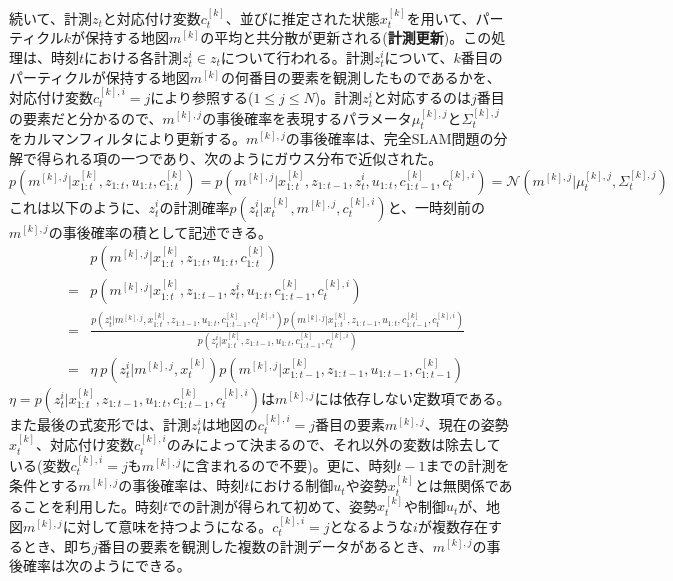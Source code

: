 \documentclass[dvipdfmx,a4paper]{jsarticle}
\begin{document}
続いて、計測$z_t$と対応付け変数$c_t^{[k]}$、並びに推定された状態$x_t^{[k]}$を用いて、パーティクル$k$が保持する地図$m^{[k]}$の平均と共分散が更新される(\textbf{計測更新})。この処理は、時刻$t$における各計測$z_t^i \in z_t$について行われる。計測$z_t^i$について、$k$番目のパーティクルが保持する地図$m^{[k]}$の何番目の要素を観測したものであるかを、対応付け変数$c_t^{[k], i} = j$により参照する($1 \le j \le N$)。計測$z_t^i$と対応するのは$j$番目の要素だと分かるので、$m^{[k], j}$の事後確率を表現するパラメータ$\mu_t^{[k], j}$と$\Sigma_t^{[k], j}$をカルマンフィルタにより更新する。$m^{[k], j}$の事後確率は、完全SLAM問題の分解で得られる項の一つであり、次のようにガウス分布で近似された。
\begin{equation}
	p(m^{[k], j} | x_{1 : t}^{[k]}, z_{1 : t}, u_{1 : t}, c_{1 : t}^{[k]}) = p(m^{[k], j} | x_{1 : t}^{[k]}, z_{1 : t - 1}, z_t^i, u_{1 : t}, c_{1 : t - 1}^{[k]}, c_t^{[k], i}) = \mathcal{N}(m^{[k], j} | \mu_t^{[k], j}, \Sigma_t^{[k], j})
\end{equation}
これは以下のように、$z_t^i$の計測確率$p(z_t^i | x_t^{[k]}, m^{[k], j}, c_t^{[k], i})$と、一時刻前の$m^{[k], j}$の事後確率の積として記述できる。
\begin{eqnarray}
	&& p(m^{[k], j} | x_{1 : t}^{[k]}, z_{1 : t}, u_{1 : t}, c_{1 : t}^{[k]}) \nonumber \\
	&=& p(m^{[k], j} | x_{1 : t}^{[k]}, z_{1 : t - 1}, z_t^i, u_{1 : t}, c_{1 : t - 1}^{[k]}, c_t^{[k], i}) \nonumber \\
	&=& \frac{p(z_t^i | m^{[k], j}, x_{1 : t}^{[k]}, z_{1 : t - 1}, u_{1 : t}, c_{1 : t - 1}^{[k]}, c_t^{[k], i}) p(m^{[k], j} | x_{1 : t}^{[k]}, z_{1 : t - 1}, u_{1 : t}, c_{1 : t - 1}^{[k]}, c_t^{[k], i})}{p(z_t^i | x_{1 : t}^{[k]}, z_{1 : t - 1}, u_{1 : t}, c_{1 : t - 1}^{[k]}, c_t^{[k], i})} \nonumber \\
	&=& \eta \ p(z_t^i | m^{[k], j}, x_t^{[k]}) p(m^{[k], j} | x_{1 : t - 1}^{[k]}, z_{1 : t - 1}, u_{1 : t - 1}, c_{1 : t - 1}^{[k]})
\end{eqnarray}
$\eta = p(z_t^i | x_{1 : t}^{[k]}, z_{1 : t - 1}, u_{1 : t}, c_{1 : t - 1}^{[k]}, c_t^{[k], i})$は$m^{[k], j}$には依存しない定数項である。また最後の式変形では、計測$z_t^i$は地図の$c_t^{[k], i} = j$番目の要素$m^{[k], j}$、現在の姿勢$x_t^{[k]}$、対応付け変数$c_t^{[k], i}$のみによって決まるので、それ以外の変数は除去している(変数$c_t^{[k], i} = j$も$m^{[k], j}$に含まれるので不要)。更に、時刻$t - 1$までの計測を条件とする$m^{[k], j}$の事後確率は、時刻$t$における制御$u_t$や姿勢$x_t^{[k]}$とは無関係であることを利用した。時刻$t$での計測が得られて初めて、姿勢$x_t^{[k]}$や制御$u_t$が、地図$m^{[k], j}$に対して意味を持つようになる。$c_t^{[k], i} = j$となるような$i$が複数存在するとき、即ち$j$番目の要素を観測した複数の計測データがあるとき、$m^{[k], j}$の事後確率は次のようにできる。
\end{document}
